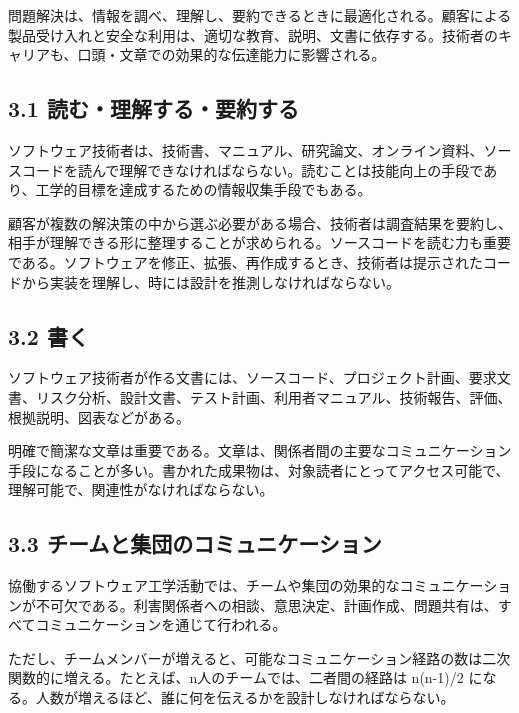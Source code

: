 \documentclass[uplatex,dvipdfmx,a4paper,11pt]{jsarticle}
\begin{document}
問題解決は、情報を調べ、理解し、要約できるときに最適化される。顧客による製品受け入れと安全な利用は、適切な教育、説明、文書に依存する。技術者のキャリアも、口頭・文章での効果的な伝達能力に影響される。

\subsection*{3.1 読む・理解する・要約する}


ソフトウェア技術者は、技術書、マニュアル、研究論文、オンライン資料、ソースコードを読んで理解できなければならない。読むことは技能向上の手段であり、工学的目標を達成するための情報収集手段でもある。

顧客が複数の解決策の中から選ぶ必要がある場合、技術者は調査結果を要約し、相手が理解できる形に整理することが求められる。ソースコードを読む力も重要である。ソフトウェアを修正、拡張、再作成するとき、技術者は提示されたコードから実装を理解し、時には設計を推測しなければならない。

\subsection*{3.2 書く}


ソフトウェア技術者が作る文書には、ソースコード、プロジェクト計画、要求文書、リスク分析、設計文書、テスト計画、利用者マニュアル、技術報告、評価、根拠説明、図表などがある。

明確で簡潔な文章は重要である。文章は、関係者間の主要なコミュニケーション手段になることが多い。書かれた成果物は、対象読者にとってアクセス可能で、理解可能で、関連性がなければならない。

\subsection*{3.3 チームと集団のコミュニケーション}


協働するソフトウェア工学活動では、チームや集団の効果的なコミュニケーションが不可欠である。利害関係者への相談、意思決定、計画作成、問題共有は、すべてコミュニケーションを通じて行われる。

ただし、チームメンバーが増えると、可能なコミュニケーション経路の数は二次関数的に増える。たとえば、n人のチームでは、二者間の経路は n(n-1)/2 になる。人数が増えるほど、誰に何を伝えるかを設計しなければならない。
\end{document}
